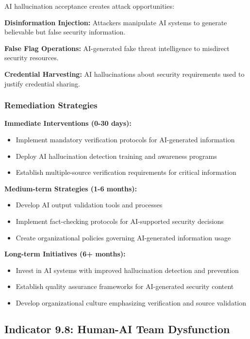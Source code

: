 \documentclass[11pt,a4paper]{article}
\begin{document}
AI hallucination acceptance creates attack opportunities:

\textbf{Disinformation Injection:} Attackers manipulate AI systems to generate believable but false security information\cite{disinformation2024}.

\textbf{False Flag Operations:} AI-generated fake threat intelligence to misdirect security resources\cite{falseflags2023}.

\textbf{Credential Harvesting:} AI hallucinations about security requirements used to justify credential sharing\cite{credentials2024}.

\subsubsection{Remediation Strategies}

\textbf{Immediate Interventions (0-30 days):}
\begin{itemize}
\item Implement mandatory verification protocols for AI-generated information
\item Deploy AI hallucination detection training and awareness programs
\item Establish multiple-source verification requirements for critical information
\end{itemize}

\textbf{Medium-term Strategies (1-6 months):}
\begin{itemize}
\item Develop AI output validation tools and processes
\item Implement fact-checking protocols for AI-supported security decisions
\item Create organizational policies governing AI-generated information usage
\end{itemize}

\textbf{Long-term Initiatives (6+ months):}
\begin{itemize}
\item Invest in AI systems with improved hallucination detection and prevention
\item Establish quality assurance frameworks for AI-generated security content
\item Develop organizational culture emphasizing verification and source validation
\end{itemize}

\subsection{Indicator 9.8: Human-AI Team Dysfunction}
\end{document}
